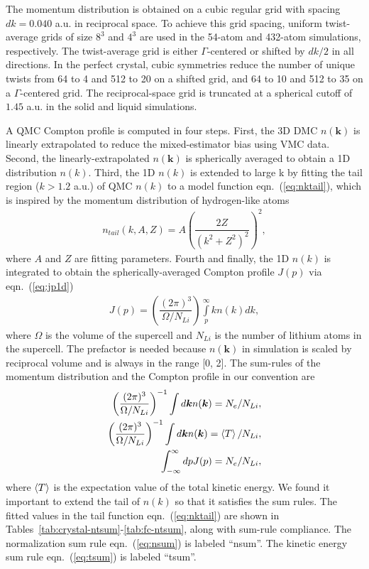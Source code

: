 \documentclass[aps,prl,superscriptaddress]{revtex4-1}
\newcommand{\bs}{\boldsymbol}
\begin{document}
The momentum distribution is obtained on a cubic regular grid with spacing $dk=0.040$ a.u. in reciprocal space. To achieve this grid spacing, uniform twist-average grids of size $8^3$ and $4^3$ are used in the 54-atom and 432-atom simulations, respectively. The twist-average grid is either $\Gamma$-centered or shifted by $dk/2$ in all directions. In the perfect crystal, cubic symmetries reduce the number of unique twists from 64 to 4 and 512 to 20 on a shifted grid, and 64 to 10 and 512 to 35 on a $\Gamma$-centered grid. The reciprocal-space grid is truncated at a spherical cutoff of $1.45$ a.u. in the solid and liquid simulations.

A QMC Compton profile is computed in four steps. First, the 3D DMC $n(\bs{k})$ is linearly extrapolated to reduce the mixed-estimator bias using VMC data. Second, the linearly-extrapolated $n(\bs{k})$ is spherically averaged to obtain a 1D distribution $n(k)$. Third, the 1D $n(k)$ is extended to large k by fitting the tail region ($k > 1.2$ a.u.) of QMC $n(k)$ to a model function eqn.~(\ref{eq:nktail}), which is inspired by the momentum distribution of hydrogen-like atoms
\begin{align} \label{eq:nktail}
n_{tail}(k, A, Z) = A\left(\dfrac{2Z}{(k^2+Z^2)^2}\right)^2,
\end{align}
where $A$ and $Z$ are fitting parameters. Fourth and finally, the 1D $n(k)$ is integrated to obtain the spherically-averaged Compton profile $J(p)$ via eqn.~(\ref{eq:jp1d})
\begin{align} \label{eq:jp1d}
J(p) = \left( \dfrac{(2\pi)^3}{\Omega/N_{Li}} \right) \int\limits_p^\infty k n(k) dk,
\end{align}
where $\Omega$ is the volume of the supercell and $N_{Li}$ is the number of lithium atoms in the supercell. The prefactor is needed because $n(\bs{k})$ in simulation is scaled by reciprocal volume and is always in the range [0, 2]. The sum-rules of the momentum distribution and the Compton profile in our convention are
\begin{align}
\left( \dfrac{(2\pi)^3}{\Omega/N_{Li}} \right)^{-1} \int d\bs{k} n(\bs{k}) = N_e/N_{Li}, \label{eq:nsum} \\
\left( \dfrac{(2\pi)^3}{\Omega/N_{Li}} \right)^{-1} \int d\bs{k} n(\bs{k}) = \braket{T}/N_{Li}, \label{eq:tsum} \\
\int_{-\infty}^{\infty} dp J(p) = N_e/N_{Li}, \label{eq:jpsum}
\end{align}
where $\braket{T}$ is the expectation value of the total kinetic energy. We found it important to extend the tail of $n(k)$ so that it satisfies the sum rules. The fitted values in the tail function eqn.~(\ref{eq:nktail}) are shown in Tables~\ref{tab:crystal-ntsum}-\ref{tab:fc-ntsum}, along with sum-rule compliance. The normalization sum rule eqn.~(\ref{eq:nsum}) is labeled ``nsum''. The kinetic energy sum rule eqn.~(\ref{eq:tsum}) is labeled ``tsum''.
\end{document}
